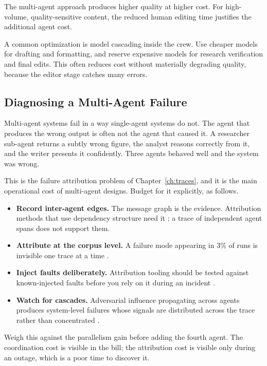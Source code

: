 The multi-agent approach produces higher quality at higher cost. For high-volume, quality-sensitive content, the reduced human editing time justifies the additional agent cost.

A common optimization is model cascading inside the crew. Use cheaper models for drafting and formatting, and reserve expensive models for research verification and final edits. This often reduces cost without materially degrading quality, because the editor stage catches many errors.

\subsection{Diagnosing a Multi-Agent Failure}

Multi-agent systems fail in a way single-agent systems do not. The agent that
produces the wrong output is often not the agent that caused it. A researcher
sub-agent returns a subtly wrong figure, the analyst reasons correctly from it,
and the writer presents it confidently. Three agents behaved well and the system
was wrong.

This is the failure attribution problem of Chapter~\ref{ch:traces}, and it is the
main operational cost of multi-agent designs. Budget for it explicitly, as follows.

\begin{itemize}
\item \textbf{Record inter-agent edges.} The message graph is the evidence.
Attribution methods that use dependency structure need it \cite{falat2026,
influencegraph2026}; a trace of independent agent spans does not support them.
\item \textbf{Attribute at the corpus level.} A failure mode appearing in 3\% of
runs is invisible one trace at a time \cite{insights2026}.
\item \textbf{Inject faults deliberately.} Attribution tooling should be tested
against known-injected faults before you rely on it during an incident
\cite{otelmas2026}.
\item \textbf{Watch for cascades.} Adversarial influence propagating across agents
produces system-level failures whose signals are distributed across the trace
rather than concentrated \cite{caspian2026}.
\end{itemize}

Weigh this against the parallelism gain before adding the fourth agent. The
coordination cost is visible in the bill; the attribution cost is visible only
during an outage, which is a poor time to discover it.

